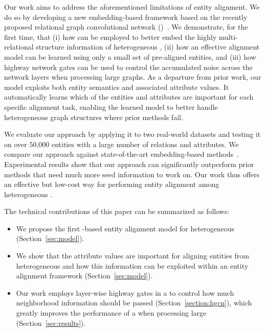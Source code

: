 Our work aims to address the aforementioned limitations of entity alignment. We do so by developing a new embedding-based framework based
on the recently proposed relational graph convolutional network (\RGCN)~\cite{Schlichtkrull2017Modeling}. We demonstrate, for the first
time, that (i) how \RGCNs can be employed to better embed the highly multi-relational structure information of heterogeneous \KGs, (ii) how
an effective alignment model can be learned using only a small set of pre-aligned entities, and (iii) how highway network gates can be used
to control the accumulated noise across the network layers when processing large graphs. As a departure from prior work, our model exploits
both entity semantics and associated attribute values. It automatically learns which of the entities and attributes are important for each
specific alignment task, enabling the learned model to better handle heterogeneous graph structures where prior methods fail.

We evaluate our approach by applying it to two real-world datasets and testing it on over 50,000 entities with a large number of relations
and attributes. We compare our approach against state-of-the-art embedding-based
methods~\cite{hao2016joint,chen2016multilingual,sun2017cross,zhu2017iterative}. Experimental results show that our approach can
significantly outperform prior methods that need much more seed information to work on. Our work thus offers an effective but low-cost way
for performing entity alignment among heterogeneous \KGs.



	
	The technical contributions of this paper can be summarized as follows:
	\begin{itemize}
		\item We propose the first \RGCN-based entity alignment model for heterogeneous \KGs (Section~\ref {sec:model}).
		
        \item We show that the attribute values are important for aligning entities from heterogeneous \KGs and how this information can
            be exploited within an entity alignment framework (Section~\ref{sec:model}).

		\item Our work employs layer-wise highway gates in a \RGCN to control how much neighborhood information should be
passed (Section~\ref{section:hgcn}), which greatly improves the performance of a \RGCN when processing
large \KGs (Section~\ref{sec:results}).
		
		
	\end{itemize}
